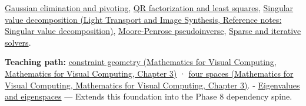 \hyperref[appendix-f6e77f4a200f]{Gaussian elimination and pivoting}, \hyperref[appendix-c3421e6b4f2c]{QR factorization and least squares}, \href{../04-Light-Transport-and-Image-Synthesis/main.pdf\#nameddest=appendix-1fad5e7f36fa}{Singular value decomposition (Light Transport and Image Synthesis, Reference notes: Singular value decomposition)}, \hyperref[appendix-541306fdbc1b]{Moore-Penrose pseudoinverse}, \hyperref[appendix-67c87a3d9e94]{Sparse and iterative solvers}.

\textbf{Teaching path:} \href{../02-Mathematics-for-Visual-Computing/main.pdf\#nameddest=01-foundations-i-ch019-a-linear-equation-is-a-measurement-and-several-equations-are-geometry}{constraint geometry (Mathematics for Visual Computing, Mathematics for Visual Computing, Chapter 3)} · \href{../02-Mathematics-for-Visual-Computing/main.pdf\#nameddest=01-foundations-i-ch019-rank-separates-what-the-measurements-determine-from-what-they-leave-free}{four spaces (Mathematics for Visual Computing, Mathematics for Visual Computing, Chapter 3)}. - \hyperref[appendix-0b3be18411f9]{Eigenvalues and eigenspaces} --- Extends this foundation into the Phase 8 dependency spine.
